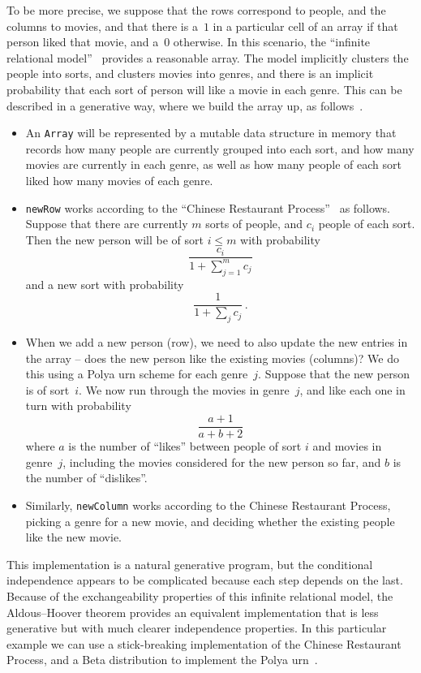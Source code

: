 \documentclass[10pt]{amsart}
\theoremstyle{definition}\newtheorem{defi}[theo]{Definition}\newtheorem{rema}[theo]{Remark}\newtheorem{exam}[theo]{Example}\newtheorem{exem}[theo]{Example}\newtheorem{nota}[theo]{Notation}
\begin{document}
To be more precise, we suppose that the rows correspond to people, and the columns to movies, and that there is a~$1$ in a particular cell of an array if that person liked that movie, and a~$0$ otherwise. In this scenario, the ``infinite relational model''~\cite{IRM,OrbanzRoy,IHRM} provides a reasonable array. The model implicitly clusters the people into sorts, and clusters movies into genres, and there is an implicit probability that each sort of person will like a movie in each genre. This can be described in a generative way, where we build the array up, as follows~\cite[Example~IV.1]{OrbanzRoy}.
\begin{itemize}
\item An \texttt{Array} will be represented by a mutable data structure in memory that records how many people are currently grouped into each sort, and how many movies are currently in each genre, as well as how many people of each sort liked how many movies of each genre.
\item \texttt{newRow} works according to the ``Chinese Restaurant Process''~\cite{ghosal2017fundamentals} as follows. Suppose that there are currently $m$ sorts of people, and $c_i$ people of each sort. Then the new person will be of sort $i\leq m$ with probability
\[
\frac{c_i}{1+\displaystyle\sum_{j=1}^mc_j}
\]
and a new sort with probability
\[
\frac{1}{1+\displaystyle\sum_jc_j}\,.
\]
\item When we add a new person (row), we need to also update the new entries in the array -- does the new person like the existing movies (columns)? We do this using a Polya urn scheme for each genre~$j$. Suppose that the new person is of sort~$i$. We now run through the movies in genre~$j$, and like each one in turn with probability
\[
\frac{a+1}{a+b+2}
\]
where $a$ is the number of ``likes'' between people of sort $i$ and movies in genre~$j$, including the movies considered for the new person so far, and $b$ is the number of ``dislikes''.
\item Similarly, \texttt{newColumn} works according to the Chinese Restaurant Process, picking a genre for a new movie, and deciding whether the existing people like the new movie.
\end{itemize}
This implementation is a natural generative program, but the conditional independence appears to be complicated because each step depends on the last. Because of the exchangeability properties of this infinite relational model, the Aldous--Hoover theorem provides an equivalent implementation that is less generative but with much clearer independence properties. In this particular example we can use a stick-breaking implementation of the Chinese Restaurant Process, and a Beta distribution to implement the Polya urn~\cite[Example~IV.6]{OrbanzRoy}.
\end{document}
